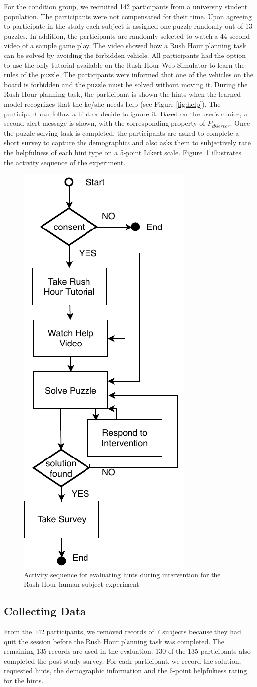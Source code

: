 For the condition group, we recruited 142 participants from a university student population.
The participants were not compensated for their time.
Upon agreeing to participate in the study each subject is assigned one puzzle randomly out of 13 puzzles. 
In addition, the participants are randomly selected to watch a 44 second video of a sample game play.
The video showed how a Rush Hour planning task can be solved by avoiding the forbidden vehicle.
All participants had the option to use the only tutorial available on the Rush Hour Web Simulator to learn the rules of the puzzle.
The participants were informed that one of the vehicles on the board is forbidden and the puzzle must be solved without moving it.
During the Rush Hour planning task, the participant is shown the hints when the learned model recognizes that the he/she needs help (see Figure \ref{fig:help}). 
The participant can follow a hint or decide to ignore it.
Based on the user's choice, a second alert message is shown, with the corresponding property of $P_{observer}$. 
Once the puzzle solving task is completed, the participants are asked to complete a short survey to capture the demographics and also asks them to subjectively rate the helpfulness of each hint type on a 5-point Likert scale. 
Figure~\ref{fig:phase2} illustrates the activity sequence of the experiment.
\begin{figure}[tpb]
  \centering
  \includegraphics[height=0.6\columnwidth]{img/phase2.pdf}
  \caption{Activity sequence for evaluating hints during intervention for the Rush Hour human subject experiment}
  \label{fig:phase2}
\end{figure}

\subsection{Collecting Data}
From the 142 participants, we removed records of 7 subjects because they had quit the session before the Rush Hour planning task was completed. 
The remaining 135 records are used in the evaluation.
130 of the 135 participants also completed the post-study survey.
For each participant, we record the solution, requested hints, the demographic information and the 5-point helpfulness rating for the hints.

